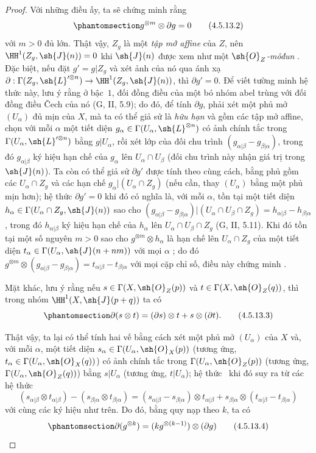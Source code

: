 \documentclass[oneside,10pt]{amsart}
\makeatletter
\newcommand{\ega@arrow}[2]{\mathchoice{#1}{#2}{#2}{#2}}
\renewcommand{\to}{\ega@arrow{\longrightarrow}{\rightarrow}}
\let\EGAOriginalLabel\label
\renewcommand{\label}[1]{\phantomsection\EGAOriginalLabel{#1}}
\makeatother
\begin{document}
\begin{proof}
  Với những điều ấy, ta sẽ chứng minh rằng
  \[
  \label{II.4.5.13.2}
    g^{\otimes m}\otimes\partial g=0
  \tag{4.5.13.2}
  \]
  với $m>0$ đủ lớn.
  Thật vậy, $Z_g$ là một \emph{tập mở affine} của $Z$, nên $\HH^1(Z_g,\sh{J}(n))=0$ khi $\sh{J}(n)$ được xem như một \emph{$\sh{O}_Z$-môđun} .
  Đặc biệt, nếu đặt $g'=g|Z_g$ và xét ảnh của nó qua ánh xạ $\partial:\Gamma(Z_g,\sh{L}'^{\otimes n})\to\HH^1(Z_g,\sh{J}(n))$, thì $\partial g'=0$.
  Để viết tường minh hệ thức này, lưu ý rằng ở bậc~$1$, đối đồng điều của một bó nhóm abel trùng với đối đồng điều \v{C}ech của nó (G, II, 5.9);
  do đó, để tính $\partial g$, phải xét một phủ mở $(U_\alpha)$ đủ mịn của $X$, mà ta có thể giả sử là \emph{hữu hạn} và gồm các tập mở affine, chọn với mỗi $\alpha$ một tiết diện $g_\alpha\in\Gamma(U_\alpha,\sh{L}^{\otimes n})$ có ảnh chính tắc trong $\Gamma(U_\alpha,\sh{L}'^{\otimes n})$ bằng $g|U_\alpha$, rồi xét lớp của đối chu trình $(g_{\alpha|\beta}-g_{\beta|\alpha})$, trong đó $g_{\alpha|\beta}$ ký hiệu hạn chế của $g_\alpha$ lên $U_\alpha\cap U_\beta$ (đối chu trình này nhận giá trị trong $\sh{J}(n)$).
  Ta còn có thể giả sử $\partial g'$ được tính theo cùng cách, bằng phủ gồm các $U_\alpha\cap Z_g$ và các hạn chế $g_\alpha|(U_\alpha\cap Z_g)$ (nếu cần, thay $(U_\alpha)$ bằng một phủ mịn hơn);
  hệ thức $\partial g'=0$ khi đó có nghĩa là, với mỗi $\alpha$, tồn tại một tiết diện $h_\alpha\in\Gamma(U_\alpha\cap Z_g,\sh{J}(n))$ sao cho $(g_{\alpha|\beta}-g_{\beta|\alpha})|(U_\alpha\cap U_\beta\cap Z_g)=h_{\alpha|\beta}-h_{\beta|\alpha}$, trong đó $h_{\alpha|\beta}$ ký hiệu hạn chế của $h_\alpha$ lên $U_\alpha\cap U_\beta\cap Z_g$ (G, II, 5.11).
  Khi đó tồn tại một số nguyên $m>0$ sao cho $g^{\otimes m}\otimes h_\alpha$ là hạn chế lên $U_\alpha\cap Z_g$ của một tiết diện $t_\alpha\in\Gamma(U_\alpha,\sh{J}(n+nm))$ với mọi $\alpha$ ;
  do đó $g^{\otimes m}\otimes(g_{\alpha|\beta}-g_{\beta|\alpha})=t_{\alpha|\beta}-t_{\beta|\alpha}$ với mọi cặp chỉ số, điều này chứng minh .

  Mặt khác, lưu ý rằng nếu $s\in\Gamma(X,\sh{O}_Z(p))$ và $t\in\Gamma(X,\sh{O}_Z(q))$, thì trong nhóm $\HH^1(X,\sh{J}(p+q))$ ta có
  \[
  \label{II.4.5.13.3}
    \partial(s\otimes t)=(\partial s)\otimes t+s\otimes(\partial t).
  \tag{4.5.13.3}
  \]

  Thật vậy, ta lại có thể tính hai vế bằng cách xét một phủ mở $(U_\alpha)$ của $X$ và, với mỗi $\alpha$, một tiết diện $s_\alpha\in\Gamma(U_\alpha,\sh{O}_X(p))$ (tương ứng, $t_\alpha\in\Gamma(U_\alpha,\sh{O}_X(q))$) có ảnh chính tắc trong $\Gamma(U_\alpha,\sh{O}_Z(p))$ (tương ứng, $\Gamma(U_\alpha,\sh{O}_Z(q))$) bằng $s|U_\alpha$ (tương ứng, $t|U_\alpha$);
  hệ thức~ khi đó suy ra từ các hệ thức
  \[
    (s_{\alpha|\beta}\otimes t_{\alpha|\beta})-(s_{\beta|\alpha}\otimes t_{\beta|\alpha})
    =(s_{\alpha|\beta}-s_{\beta|\alpha})\otimes t_{\alpha|\beta}+s_{\beta|\alpha}\otimes(t_{\alpha|\beta}-t_{\beta|\alpha})
  \]
  với cùng các ký hiệu như trên.
  Do đó, bằng quy nạp theo $k$, ta có
  \[
  \label{II.4.5.13.4}
    \partial(g^{\otimes k})=(kg^{\otimes(k-1)})\otimes(\partial g)
  \tag{4.5.13.4}
  \]


\end{proof}
\end{document}
